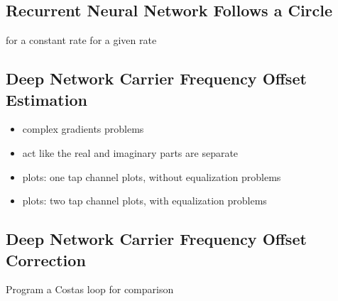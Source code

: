 \subsection{Recurrent Neural Network Follows a Circle}
for a constant rate
for a given rate


\subsection{Deep Network Carrier Frequency Offset Estimation}
\begin{itemize}
\item complex gradients problems
\item act like the real and imaginary parts are separate
\item plots: one tap channel plots, without equalization problems
\item plots: two tap channel plots, with equalization problems
\end{itemize}

\subsection{Deep Network Carrier Frequency Offset Correction}
Program a Costas loop for comparison 